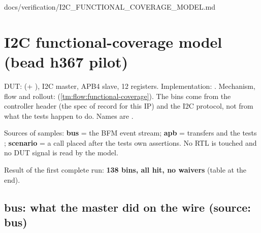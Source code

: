 \begin{relocated}{docs/verification/I2C_FUNCTIONAL_COVERAGE_MODEL.md}
\section{I2C functional-coverage model (bead h367 pilot)}\label{tm:flow:i2c-functional-coverage-model}

DUT:  (+ ),
I2C master, APB4 slave, 12 registers. Implementation:
. Mechanism, flow and rollout:
 (\cref{tm:flow:functional-coverage}). The bins come from the controller header
(the spec of record for this IP) and the I2C protocol, not from what the
tests happen to do. Names are .

Sources of samples: \textbf{bus} = the  BFM event stream;
\textbf{apb} =  transfers and the
tests\textquotesingle{} ; \textbf{scenario} = a call placed
after the test\textquotesingle s own assertions. No RTL is touched and
no DUT signal is read by the model.

Result of the first complete run: \textbf{138 bins, all hit, no waivers}
(table at the end).

\subsection{bus: what the master did on the wire (source: bus)}\label{tm:flow:i2c-functional-coverage-model:bus-what-the-master-did-on-the-wire-source-bus}

{\footnotesize\setlength{\tabcolsep}{3pt}

}
\end{relocated}

